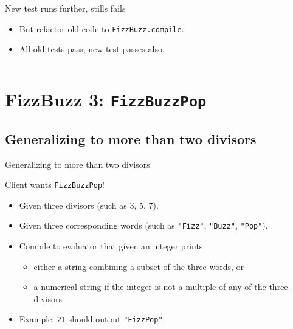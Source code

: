 \begin{frame}[fragile]{New test runs further, stills fails}
  \begin{itemize}
  \item But refactor old code to \texttt{FizzBuzz.compile}.
  \item All old tests pass; new test passes also.
  \end{itemize}

  \inputminted{scala}{FizzBuzz3Compile.scala}
\end{frame}

\section{FizzBuzz 3: \texttt{FizzBuzzPop}}

\subsection{Generalizing to more than two divisors}

\begin{frame}[fragile]{Generalizing to more than two divisors}
  \begin{block}{Client wants \texttt{FizzBuzzPop}!}
  \begin{itemize}
  \item Given three divisors (such as 3, 5, 7).
  \item Given three corresponding words (such as \texttt{"Fizz"}, \texttt{"Buzz"}, \texttt{"Pop"}).
  \item Compile to evaluator that given an integer prints:
    \begin{itemize}
    \item either a string combining a subset of the three words, or
    \item a numerical string if the integer is not a multiple of any of the three divisors
    \end{itemize}
  \item Example: \texttt{21} should output \texttt{"FizzPop"}.
  \end{itemize}
  \end{block}
\end{frame}


